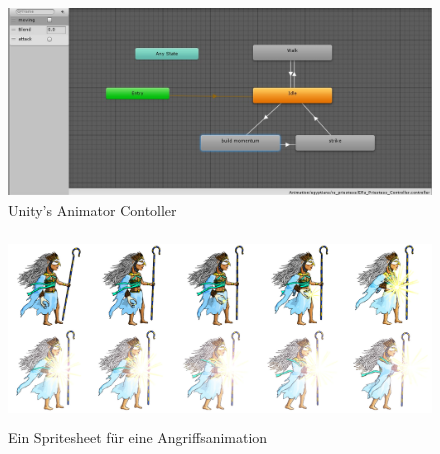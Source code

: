 \documentclass[extern,palatino]{cgBA}
\begin{document}
\begin{figure}[H]
	\centering
	\includegraphics[height=5cm]{animator.jpg}
	\caption{Unity's Animator Contoller}
\end{figure}
\begin{figure}[H]
	\centering
	\includegraphics[height=5cm]{attack1.jpg}
	\caption{Ein Spritesheet für eine Angriffsanimation}
\end{figure}
	
	
\end{document}
